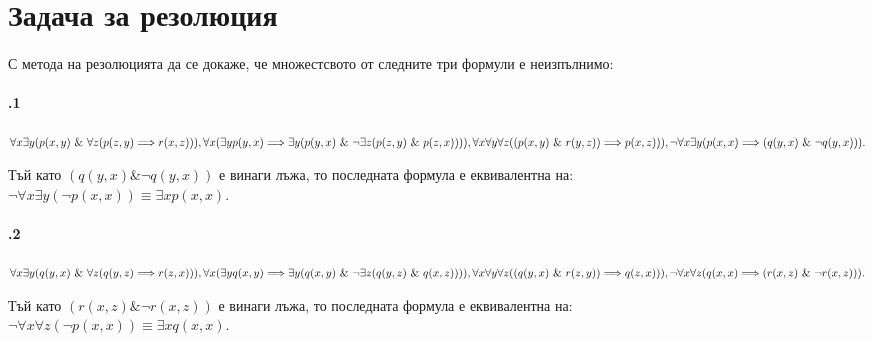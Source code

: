 \documentclass[]{article}
\begin{document}
\vskip 0.2in

\newpage
\section{Задача за резолюция}
\paragraph{}
С метода на резолюцията да се докаже, че множестсвото от следните три формули е неизпълнимо:\\
\paragraph{\hspace{0.5em} .1} 
\begin{addmargin}[1em]{2em}
$\forall x \exists y (p(x,y)\ \& \ \forall z (p(z,y) \Longrightarrow r(x,z))),\\
\forall x( \exists y p(y,x) \Longrightarrow \exists y(p(y,x)\ \& \ \neg\exists z(p(z,y)\ \& \ p(z,x)))), \\
\forall x \forall y \forall z ((p(x,y)\ \& \ r(y,z)) \Longrightarrow p(x, z))),\\
\neg \forall x \exists y (p(x,x) \Longrightarrow (q(y, x) \ \& \ \neg q(y,x))).$
\end{addmargin}

\indent * Тъй като $(q(y, x)\&\neg q(y, x))$ е винаги лъжа, то последната формула е еквивалентна на: \\ \indent $ \neg \forall x \exists y (\neg p(x,x))  \equiv \exists x p(x,x).$ \\
\paragraph{\hspace{0.5em} .2} 
\begin{addmargin}[1em]{2em}
$\forall x \exists y (q(y,x)\ \& \ \forall z (q(y,z) \Longrightarrow r(z,x))),\\
\forall x( \exists y q(x,y) \Longrightarrow \exists y(q(x,y)\ \& \ \neg\exists z(q(y,z)\ \& \ q(x,z)))), \\
\forall x \forall y \forall z ((q(y,x)\ \& \ r(z,y)) \Longrightarrow q(z, x))),\\
\neg \forall x \forall z (q(x,x) \Longrightarrow (r(x,z) \ \& \ \neg r(x,z))).$
\end{addmargin}

\indent * Тъй като $(r(x, z)\&\neg r(x, z))$ е винаги лъжа, то последната формула е еквивалентна на: \\ \indent $ \neg \forall x \forall z (\neg p(x,x))  \equiv \exists x q(x,x).$ \\
\vskip 0.2in
\end{document}
